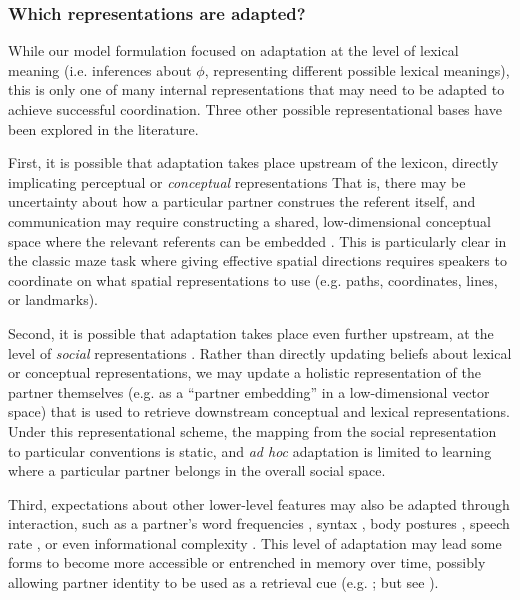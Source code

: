 \subsubsection{Which representations are adapted?}

While our model formulation focused on adaptation at the level of lexical meaning (i.e. inferences about $\phi$, representing different possible lexical meanings), this is only one of many internal representations that may need to be adapted to achieve successful coordination. 
Three other possible representational bases have been explored in the literature. 

First, it is possible that adaptation takes place upstream of the lexicon, directly implicating perceptual or \emph{conceptual} representations \cite{GarrodAnderson87_SayingWhatYouMean,HealeySwobodaUmataKing07_GraphicalLanguageGames}
That is, there may be uncertainty about how a particular partner construes the referent itself, and communication may require constructing a shared, low-dimensional conceptual space where the relevant referents can be embedded \cite{stolk2016conceptual}.
This is particularly clear in the classic maze task \cite{GarrodAnderson87_SayingWhatYouMean} where giving effective spatial directions requires speakers to coordinate on what spatial representations to use (e.g. paths, coordinates, lines, or landmarks). 

Second, it is possible that adaptation takes place even further upstream, at the level of \emph{social} representations \cite{jaech2018low}.
Rather than directly updating beliefs about lexical or conceptual representations, we may update a holistic representation of the partner themselves (e.g. as a ``partner embedding'' in a low-dimensional vector space) that is used to retrieve downstream conceptual and lexical representations. 
Under this representational scheme, the mapping from the social representation to particular conventions is static, and \emph{ad hoc} adaptation is limited to learning where a particular partner belongs in the overall social space.

Third, expectations about other lower-level features may also be adapted through interaction, such as a partner's word frequencies \cite{louwerse2012behavior}, syntax \cite{gruberg2019syntactic,levelt1982surface}, body postures \cite{lakin2003using}, speech rate \cite{giles1991contexts}, or even informational complexity \cite{abney2014complexity}.
This level of adaptation may lead some forms to become more accessible or entrenched in memory over time, possibly allowing partner identity to be used as a retrieval cue (e.g. ; but see \cite{brown2014influence}).

